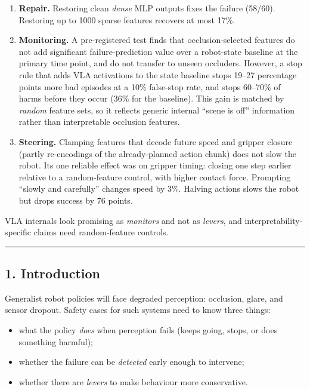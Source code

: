 \documentclass[
  10pt,
]{article}
\providecommand{\tightlist}{%
  \setlength{\itemsep}{0pt}\setlength{\parskip}{0pt}}
\begin{document}
\begin{enumerate}
\def\labelenumi{\arabic{enumi}.}
\tightlist
\item
  \textbf{Repair.} Restoring clean \emph{dense} MLP outputs fixes the
  failure (58/60). Restoring up to 1000 sparse features recovers at most
  17\%.
\item
  \textbf{Monitoring.} A pre-registered test finds that
  occlusion-selected features do not add significant failure-prediction
  value over a robot-state baseline at the primary time point, and do
  not transfer to unseen occluders. However, a stop rule that adds VLA
  activations to the state baseline stops 19--27 percentage points more
  bad episodes at a 10\% false-stop rate, and stops 60--70\% of harms
  before they occur (36\% for the baseline). This gain is matched by
  \emph{random} feature sets, so it reflects generic internal ``scene is
  off'' information rather than interpretable occlusion features.
\item
  \textbf{Steering.} Clamping features that decode future speed and
  gripper closure (partly re-encodings of the already-planned action
  chunk) does not slow the robot. Its one reliable effect was on gripper
  timing: closing one step earlier relative to a random-feature control,
  with higher contact force. Prompting ``slowly and carefully'' changes
  speed by 3\%. Halving actions slows the robot but drops success by 76
  points.
\end{enumerate}

VLA internals look promising as \emph{monitors} and not as
\emph{levers}, and interpretability-specific claims need random-feature
controls.

\begin{center}\rule{0.5\linewidth}{0.5pt}\end{center}

\hypertarget{introduction}{%
\subsection{1. Introduction}\label{introduction}}

Generalist robot policies will face degraded perception: occlusion,
glare, and sensor dropout. Safety cases for such systems need to know
three things:

\begin{itemize}
\tightlist
\item
  what the policy \emph{does} when perception fails (keeps going, stops,
  or does something harmful);
\item
  whether the failure can be \emph{detected} early enough to intervene;
\item
  whether there are \emph{levers} to make behaviour more conservative.
\end{itemize}
\end{document}
